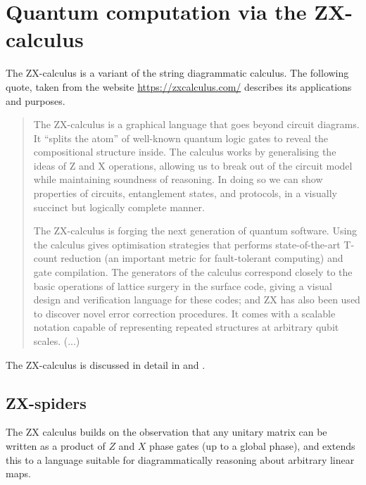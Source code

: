 \documentclass[a4paper, oneside, 12pt]{amsart}
\begin{document}
\section{Quantum computation via the ZX-calculus}\label{sec:quantum-computation-via-the-zx-calculus}

The ZX-calculus is a variant of the string diagrammatic calculus.
The following quote, taken from the website \url{https://zxcalculus.com/} describes its applications and purposes.

\begin{quote}
  The ZX-calculus is a graphical language that goes beyond circuit diagrams.
  It ``splits the atom'' of well-known quantum logic gates to reveal the compositional structure inside.
  The calculus works by generalising the ideas of Z and X operations, allowing us to break out of the circuit model while maintaining soundness of reasoning.
  In doing so we can show properties of circuits, entanglement states, and protocols, in a visually succinct but logically complete manner.

  The ZX-calculus is forging the next generation of quantum software.
  Using the calculus gives optimisation strategies that performs state-of-the-art T-count reduction (an important metric for fault-tolerant computing) and gate compilation.
  The generators of the calculus correspond closely to the basic operations of lattice surgery in the surface code, giving a visual design and verification language for these codes; and ZX has also been used to discover novel error correction procedures.
  It comes with a scalable notation capable of representing repeated structures at arbitrary qubit scales. (...)
\end{quote}

The ZX-calculus is discussed in detail in \cite[Chapter~3]{kissinger-wetering2025:PicturingQuantumSoftware} and \cite{coecke-kissinger2017:PicturingQuantumProcesses}.
\subsection{ZX-spiders}\label{sec:zx-spiders}
The ZX calculus builds on the observation that any unitary matrix can be written as a product of \(Z\) and \(X\) phase gates (up to a global phase), and extends this to a language suitable for diagrammatically reasoning about arbitrary linear maps.
\end{document}
